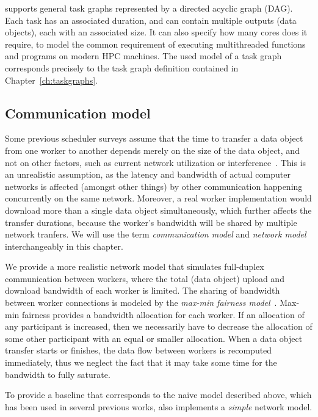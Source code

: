 \estee{} supports general task graphs represented by a directed acyclic graph (DAG).
Each task has an associated duration, and can contain multiple outputs (data objects), each with an
associated size. It can also specify how many cores does it require, to model the common
requirement of executing multithreaded functions and programs on modern HPC machines. The used
model of a task graph corresponds precisely to the task graph definition contained in
Chapter~\ref{ch:taskgraphs}.

\subsection{Communication model}
Some previous scheduler surveys assume that the time to transfer a data object from one worker to
another depends merely on the size of the data object, and not on other factors, such as current
network utilization or interference~\cite{tang2010list,yao2013task,wang2018list,kwok1996dynamic}. This is an unrealistic assumption, as
the latency and bandwidth of actual computer networks is affected (amongst other things) by other
communication happening concurrently on the same network. Moreover, a real worker implementation
would download more than a single data object simultaneously, which further affects the transfer
durations, because the worker's bandwidth will be shared by multiple network tranfers. We will use
the term \emph{communication model} and \emph{network model} interchangeably in this chapter.

We provide a more realistic network model that simulates full-duplex communication between workers,
where the total (data object) upload and download bandwidth of each worker is limited. The sharing
of bandwidth between worker connections is modeled by the
\emph{max-min fairness model}~\cite{bertsekas_1992}. Max-min fairness provides a bandwidth allocation for
each worker. If an allocation of any participant is increased, then we necessarily have to decrease
the allocation of some other participant with an equal or smaller allocation. When a data object
transfer starts or finishes, the data flow between workers is recomputed immediately, thus we
neglect the fact that it may take some time for the bandwidth to fully saturate.


To provide a baseline that corresponds to the naive model described above, which has been used in
several previous works, \estee{} also implements a \emph{simple} network model.

